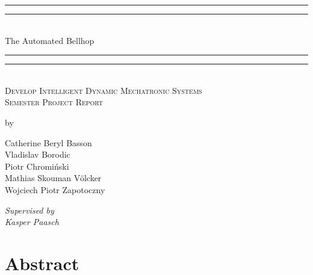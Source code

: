 \documentclass[11pt]{article}
\begin{document}
{
  \thispagestyle{empty}

\centering %
\vspace*{\baselineskip} %

\rule{\textwidth}{1.6pt}\vspace*{-\baselineskip}\vspace*{2pt} %
\rule{\textwidth}{0.4pt}\\[\baselineskip] %

{\LARGE The Automated Bellhop}\\[0.2\baselineskip] %

\rule{\textwidth}{0.4pt}\vspace*{-\baselineskip}\vspace{3.2pt} %
\rule{\textwidth}{1.6pt}\\[\baselineskip] %

\scshape %
Develop Intelligent Dynamic Mechatronic Systems\\Semester Project Report\\[\baselineskip] %

\vspace*{2\baselineskip} %

by \\[\baselineskip]
{\Large Catherine Beryl Basson \\ Vladislav Borodic \\ Piotr Chromi\'nski \\ Mathias Skouman V\"olcker \\ Wojciech Piotr Zapotoczny \\\par} %
{\vspace{5pt} \itshape Supervised by \\ Kasper Paasch\par} %
}
\newpage
{}
\section{Abstract}
\newpage
\tableofcontents
{}
\lstset{style=customc}
\end{document}
